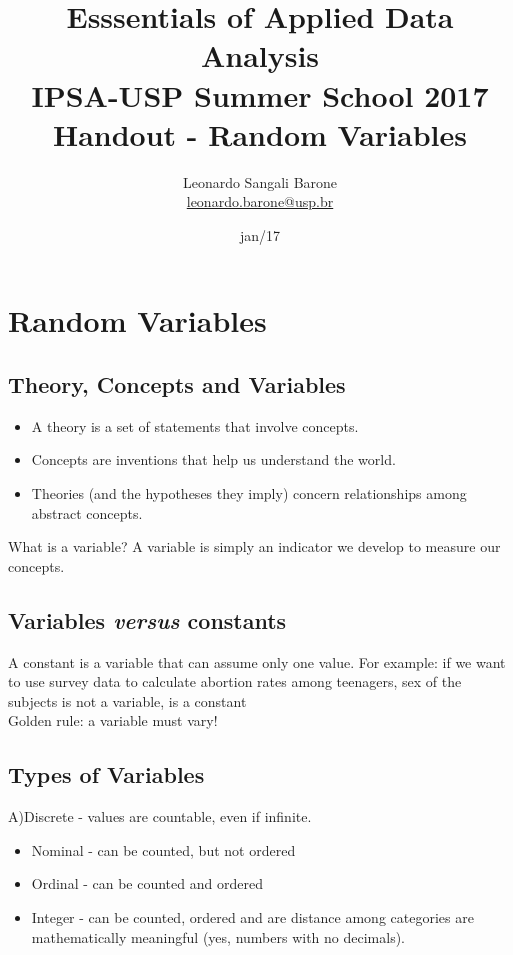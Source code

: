 \documentclass[11pt]{article}
\title{\textbf{Esssentials of Applied Data Analysis\\
				IPSA-USP Summer School 2017}\newline\\
				Handout - Random Variables}
\author{Leonardo Sangali Barone\\ \href{leonardo.barone@usp.br}{leonardo.barone@usp.br}}
\date{jan/17}
\begin{document}
\maketitle

\section*{Random Variables}

	\subsection*{Theory, Concepts and Variables}

	\begin{itemize}

	\item A theory is a set of statements that involve concepts.
	\item Concepts are inventions that help us understand the world.
	\item Theories (and the hypotheses they imply) concern relationships among abstract concepts.
	\end{itemize}
	What is a variable? A variable is simply an indicator we develop to measure our concepts.


	\subsection*{Variables \emph{versus} constants}
	A constant is a variable that can assume only one value. For example: if we want to use survey data to calculate abortion rates among teenagers, sex of the subjects is not a variable, is a constant\\
	
	Golden rule: a variable must vary!


	\subsection*{Types of Variables}
	
	A)Discrete - values are countable, even if infinite.
	
	\begin{itemize}
		\item Nominal - can be counted, but not ordered
		\item Ordinal - can be counted and ordered
		\item Integer - can be counted, ordered and are distance among categories are mathematically meaningful (yes, numbers with no decimals).
	\end{itemize}
	
\end{document}
